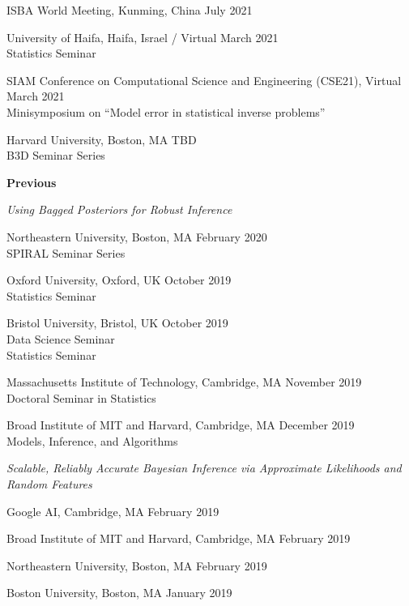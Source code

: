 \documentclass[margin,line]{res}
\newenvironment{talkgroup}{\setlength{\parskip}{3pt}\everypar{\hangafter=1\hangindent=1em\relax}\par}{\par\everypar{\hangafter=0\relax}}
\begin{document}
\begin{resume}
\begin{talkgroup}
ISBA World Meeting, Kunming, China \hfill July 2021

University of Haifa, Haifa, Israel / Virtual \hfill March 2021 \\
Statistics Seminar

SIAM Conference on Computational Science and Engineering (CSE21), Virtual \hfill March 2021 \\
Minisymposium on ``Model error in statistical inverse problems''

Harvard University, Boston, MA \hfill TBD \\
B3D Seminar Series

\end{talkgroup}

\textbf{Previous}

\emph{Using Bagged Posteriors for Robust Inference}

\begin{talkgroup}
Northeastern University, Boston, MA \hfill February 2020 \\
SPIRAL Seminar Series

Oxford University, Oxford, UK \hfill October 2019 \\
Statistics Seminar

Bristol University, Bristol, UK \hfill October 2019 \\
Data Science Seminar \\
Statistics Seminar

Massachusetts Institute of Technology, Cambridge, MA  \hfill November 2019 \\
Doctoral Seminar in Statistics

Broad Institute of MIT and Harvard, Cambridge, MA \hfill December 2019 \\
Models, Inference, and Algorithms

\end{talkgroup}

\emph{Scalable, Reliably Accurate Bayesian Inference via Approximate Likelihoods and Random Features}

\begin{talkgroup}
Google AI, Cambridge, MA \hfill February 2019

Broad Institute of MIT and Harvard, Cambridge, MA \hfill February 2019

Northeastern University, Boston, MA \hfill February 2019

Boston University, Boston, MA \hfill January 2019


\end{talkgroup}
\end{resume}
\end{document}
